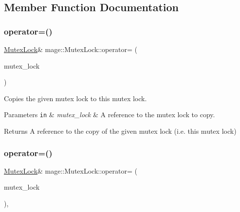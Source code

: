 \subsection{Member Function Documentation}
\hypertarget{classmage_1_1_mutex_lock_a739909161a9a9ca0fc8143ac84967765}{}\label{classmage_1_1_mutex_lock_a739909161a9a9ca0fc8143ac84967765} 
\subsubsection{\texorpdfstring{operator=()}{operator=()}\hspace{0.1cm}{\footnotesize\ttfamily [1/2]}}
{\footnotesize\ttfamily \hyperlink{classmage_1_1_mutex_lock}{Mutex\+Lock}\& mage\+::\+Mutex\+Lock\+::operator= (\begin{DoxyParamCaption}\item[{const \hyperlink{classmage_1_1_mutex_lock}{Mutex\+Lock} \&}]{mutex\+\_\+lock }\end{DoxyParamCaption})\hspace{0.3cm}{\ttfamily [delete]}}

Copies the given mutex lock to this mutex lock.


\begin{DoxyParams}[1]{Parameters}
\mbox{\tt in}  & {\em mutex\+\_\+lock} & A reference to the mutex lock to copy. \\
\hline
\end{DoxyParams}
\begin{DoxyReturn}{Returns}
A reference to the copy of the given mutex lock (i.\+e. this mutex lock) 
\end{DoxyReturn}
\hypertarget{classmage_1_1_mutex_lock_a1fcd5e6856dfbe643aba405dd23ffbe5}{}\label{classmage_1_1_mutex_lock_a1fcd5e6856dfbe643aba405dd23ffbe5} 
\subsubsection{\texorpdfstring{operator=()}{operator=()}\hspace{0.1cm}{\footnotesize\ttfamily [2/2]}}
{\footnotesize\ttfamily \hyperlink{classmage_1_1_mutex_lock}{Mutex\+Lock}\& mage\+::\+Mutex\+Lock\+::operator= (\begin{DoxyParamCaption}\item[{\hyperlink{classmage_1_1_mutex_lock}{Mutex\+Lock} \&\&}]{mutex\+\_\+lock }\end{DoxyParamCaption})\hspace{0.3cm}{\ttfamily [default]}, {\ttfamily [noexcept]}}

